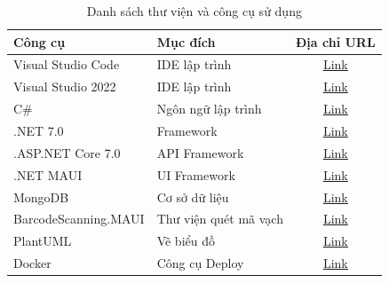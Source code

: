 \documentclass[../DoAn.tex]{subfiles}
\begin{document}
\begin{table}[H]
    \centering
    \begin{tabularx}{\textwidth}{|X|X|c|}
        \hline
        \textbf{Công cụ}     & \textbf{Mục đích}     & \textbf{Địa chỉ URL}                                                                             \\ \hline
        Visual Studio Code   & IDE lập trình         & \href{https://code.visualstudio.com/}{\color{blue}\underline{Link}}                              \\ \hline
        Visual Studio 2022   & IDE lập trình         & \href{https://visualstudio.microsoft.com/}{\color{blue}\underline{Link}}                         \\ \hline
        C\#                  & Ngôn ngữ lập trình    & \href{https://docs.microsoft.com/en-us/dotnet/csharp/}{\color{blue}\underline{Link}}             \\ \hline
        .NET 7.0             & Framework             & \href{https://dotnet.microsoft.com/}{\color{blue}\underline{Link}}                               \\ \hline
        .ASP.NET Core 7.0    & API Framework         & \href{https://dotnet.microsoft.com/en-us/apps/aspnet/}{\color{blue}\underline{Link}}             \\ \hline
        .NET MAUI            & UI Framework          & \href{https://docs.microsoft.com/en-us/dotnet/maui/}{\color{blue}\underline{Link}}               \\ \hline
        MongoDB              & Cơ sở dữ liệu         & \href{https://www.mongodb.com/}{\color{blue}\underline{Link}}                                    \\ \hline
        BarcodeScanning.MAUI & Thư viện quét mã vạch & \href{https://www.nuget.org/packages/BarcodeScanning.Native.Maui/}{\color{blue}\underline{Link}} \\ \hline
        PlantUML             & Vẽ biểu đồ            & \href{https://plantuml.com/}{\color{blue}\underline{Link}}                                       \\ \hline
        Docker               & Công cụ Deploy        & \href{https://www.docker.com/}{\color{blue}\underline{Link}}                                     \\ \hline
    \end{tabularx}
    \caption{Danh sách thư viện và công cụ sử dụng}
    \label{table:implementation_toolkit}
\end{table}
\end{document}
